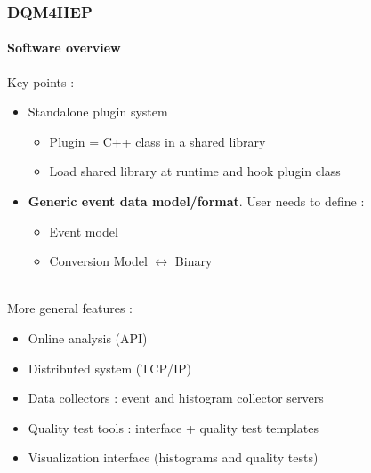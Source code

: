 \documentclass[presentation, 10pt]{beamer}
\begin{document}
\begin{frame}
  \frametitle{DQM4HEP}
  \framesubtitle{Software overview}
  \footnotesize
  Key points :
  \begin{itemize}
    \item Standalone plugin system
    \begin{itemize}
      \scriptsize
      \item Plugin = C++ class in a shared library
      \item Load shared library at runtime and hook plugin class
    \end{itemize}
    \item \textbf{Generic event data model/format}. User needs to define :
    \begin{itemize}
      \scriptsize
      \item Event model
      \item Conversion Model $\leftrightarrow$ Binary
    \end{itemize}
  \end{itemize}
  ~ \\
  More general features :
  \begin{itemize}
    \item Online analysis (API)
    \item Distributed system (TCP/IP)
    \item Data collectors : event and histogram collector servers
    \item Quality test tools : interface + quality test templates
    \item Visualization interface (histograms and quality tests)
  \end{itemize}
\end{frame}
\end{document}
